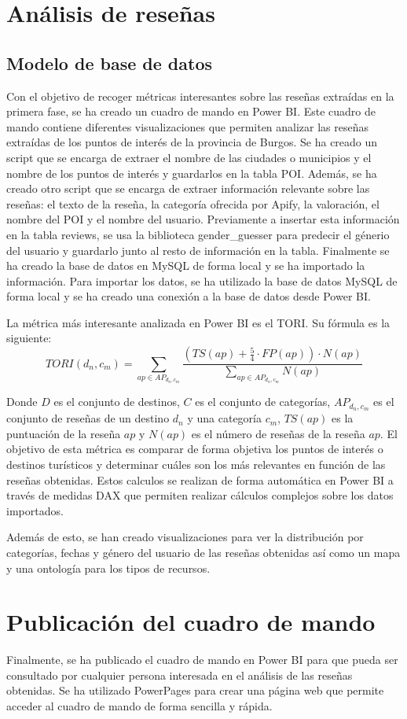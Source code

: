 \section{Análisis de reseñas}

\subsection{Modelo de base de datos}

Con el objetivo de recoger métricas interesantes sobre las reseñas extraídas en la primera fase, se ha creado un cuadro de mando en Power BI.
Este cuadro de mando contiene diferentes visualizaciones que permiten analizar las reseñas extraídas de los puntos de interés de la provincia de Burgos.
Se ha creado un script que se encarga de extraer el nombre de las ciudades o municipios y el nombre de los puntos de interés y guardarlos en la tabla POI.
Además, se ha creado otro script que se encarga de extraer información relevante sobre las reseñas: el texto de la reseña, la categoría ofrecida por Apify, la valoración, el nombre del POI y el nombre del usuario.
Previamente a insertar esta información en la tabla reviews, se usa la biblioteca gender\_guesser para predecir el génerio del usuario y guardarlo junto al resto de información en la tabla.
Finalmente se ha creado la base de datos en MySQL de forma local y se ha importado la información.
Para importar los datos, se ha utilizado la base de datos MySQL de forma local y se ha creado una conexión a la base de datos desde Power BI.

La métrica más interesante analizada en Power BI es el TORI. Su fórmula es la siguiente:
\begin{equation}
    TORI(d_n, c_m) = \sum_{ap \in AP_{d_n, c_m}} \frac{\left( TS(ap) + \frac{5}{4} \cdot FP(ap) \right) \cdot N(ap)}{\sum_{ap \in AP_{d_n, c_m}} N(ap)}
\end{equation} 

Donde $D$ es el conjunto de destinos, $C$ es el conjunto de categorías, $AP_{d_n,c_m}$ es el conjunto de reseñas de un destino $d_n$ y una categoría $c_m$, $TS(ap)$ es la puntuación de la reseña $ap$ y $N(ap)$ es el número de reseñas de la reseña $ap$.
El objetivo de esta métrica es comparar de forma objetiva los puntos de interés o destinos turísticos y determinar cuáles son los más relevantes en función de las reseñas obtenidas.
Estos calculos se realizan de forma automática en Power BI a través	de medidas DAX que permiten realizar cálculos complejos sobre los datos importados.

Además de esto, se han creado visualizaciones para ver la distribución por categorías, fechas y género del usuario de las reseñas obtenidas así como un mapa y una ontología para los tipos de recursos.

\section{Publicación del cuadro de mando}

Finalmente, se ha publicado el cuadro de mando en Power BI para que pueda ser consultado por cualquier persona interesada en el análisis de las reseñas obtenidas.
Se ha utilizado PowerPages para crear una página web que permite acceder al cuadro de mando de forma sencilla y rápida.